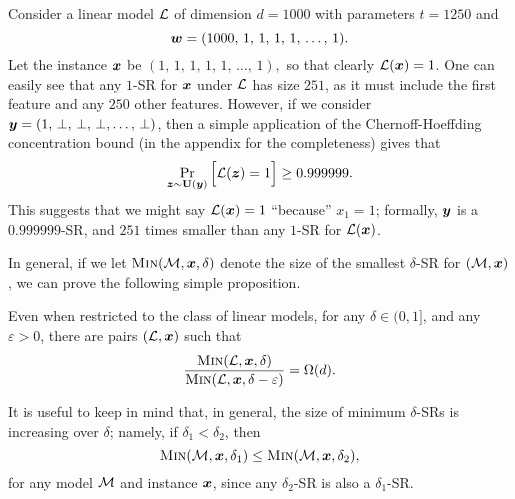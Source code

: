 

\begin{example}
Consider a linear model $\mathcal{L}$ of dimension $d= 1000$ with parameters $t = 1250$ and
$$
	{\bm{w}} = (
		1000, \, 1, \, 1, \,  1, \,  1, \,  \ldots, \, 1
	).
$$
Let the instance ${\bm{x}}$ be 
	$(
		1, \, 1, \, 1, \,  1, \,  1, \,  \ldots, \, 1
	),$ so that clearly $\mathcal{L}({\bm{x}}) = 1$.
One can easily see that any $1$-SR for ${\bm{x}}$ under $\mathcal{L}$ has size $251$, as it must include the first feature and any $250$ other features.
However, if we consider ${\bm{y}} = (
		1, \, \bot, \, \bot, \,  \bot,  \ldots, \, \bot
	)$, then a simple application of the Chernoff-Hoeffding concentration bound (in the appendix for the completeness) gives that
\[
	\Pr_{{\bm{z}} \sim \mathbf{U}({\bm{y}})}\Big[ \mathcal{L}({\bm{z}}) = 1\Big] \geq  0.999999.\]
	This suggests that we might say $\mathcal{L}({\bm{x}}) = 1$ ``because'' $x_1 = 1$; formally, ${\bm{y}}$ is a $0.999999$-SR, and $251$ times smaller than any $1$-SR for $\mathcal{L}({\bm{x}})$.
\label{ex:delta-sr-size}
\end{example}

In general, if we let $\operatorname{\textsc{Min}}(\mathcal{M}, {\bm{x}}, \delta)$ denote the size of the smallest $\delta$-SR for $(\mathcal{M}, {\bm{x}})$, we can prove the following simple proposition.

\begin{proposition}\label{prop:delta-sr-size}
	Even when restricted to the class of linear models, for any $\delta \in (0, 1]$, and any $\varepsilon > 0$, there are pairs $(\mathcal{L}, {\bm{x}})$  such that
	\[ 
		\frac{\operatorname{\textsc{Min}}(\mathcal{L}, {\bm{x}}, \delta)}{\operatorname{\textsc{Min}}(\mathcal{L}, {\bm{x}}, \delta-\varepsilon)} = \Omega(d).
	\]
\end{proposition}

It is useful to keep in mind that, in general, the size of minimum $\delta$-SRs is increasing over $\delta$; namely, if $\delta_1 < \delta_2$, then 
\[
	\operatorname{\textsc{Min}}(\mathcal{M}, {\bm{x}}, \delta_1) \leq \operatorname{\textsc{Min}}(\mathcal{M}, {\bm{x}}, \delta_2),
\]
for any model $\mathcal{M}$ and instance ${\bm{x}}$, since any $\delta_2$-SR is also a $\delta_1$-SR. 
